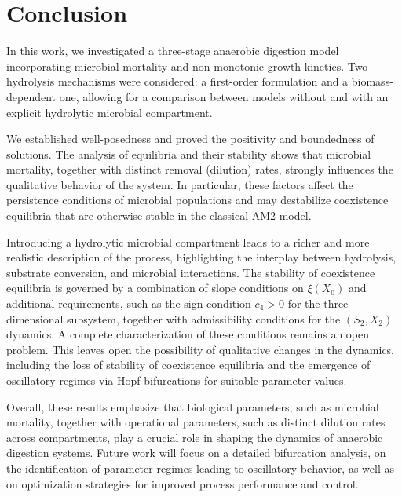 \documentclass[runningheads]{llncs}
\begin{document}
\section{Conclusion}                  \label{SecConclu}
In this work, we investigated a three-stage anaerobic digestion model incorporating microbial mortality and non-monotonic growth kinetics. Two hydrolysis mechanisms were considered: a first-order formulation and a biomass-dependent one, allowing for a comparison between models without and with an explicit hydrolytic microbial compartment.

We established well-posedness and proved the positivity and boundedness of solutions. The analysis of equilibria and their stability shows that microbial mortality, together with distinct removal (dilution) rates, strongly influences the qualitative behavior of the system. In particular, these factors affect the persistence conditions of microbial populations and may destabilize coexistence equilibria that are otherwise stable in the classical AM2 model.

Introducing a hydrolytic microbial compartment leads to a richer and more realistic description of the process, highlighting the interplay between hydrolysis, substrate conversion, and microbial interactions. The stability of coexistence equilibria is governed by a combination of slope conditions on $\xi(X_0)$ and additional requirements, such as the sign condition $c_4>0$ for the three-dimensional subsystem, together with admissibility conditions for the $(S_2,X_2)$ dynamics. A complete characterization of these conditions remains an open problem. This leaves open the possibility of qualitative changes in the dynamics, including the loss of stability of coexistence equilibria and the emergence of oscillatory regimes via Hopf bifurcations for suitable parameter values.

Overall, these results emphasize that biological parameters, such as microbial mortality, together with operational parameters, such as distinct dilution rates across compartments, play a crucial role in shaping the dynamics of anaerobic digestion systems. Future work will focus on a detailed bifurcation analysis, on the identification of parameter regimes leading to oscillatory behavior, as well as on optimization strategies for improved process performance and control.
\appendix
\end{document}
